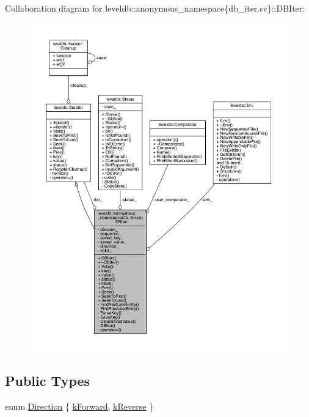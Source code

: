 Collaboration diagram for leveldb\+:\+:anonymous\+\_\+namespace\{db\+\_\+iter.\+cc\}\+:\+:D\+B\+Iter\+:
\nopagebreak
\begin{figure}[H]
\begin{center}
\leavevmode
\includegraphics[width=350pt]{classleveldb_1_1anonymous__namespace_02db__iter_8cc_03_1_1_d_b_iter__coll__graph}
\end{center}
\end{figure}
\subsection*{Public Types}
\begin{DoxyCompactItemize}
\item 
enum \hyperlink{classleveldb_1_1anonymous__namespace_02db__iter_8cc_03_1_1_d_b_iter_a8110fc354a165a0f317584cef2d903f7}{Direction} \{ \hyperlink{classleveldb_1_1anonymous__namespace_02db__iter_8cc_03_1_1_d_b_iter_a8110fc354a165a0f317584cef2d903f7a00e595847b7f445de598cfca013010b8}{k\+Forward}, 
\hyperlink{classleveldb_1_1anonymous__namespace_02db__iter_8cc_03_1_1_d_b_iter_a8110fc354a165a0f317584cef2d903f7ae3d7d5f1515d5d6dfa768ad0438049dc}{k\+Reverse}
 \}
\end{DoxyCompactItemize}

